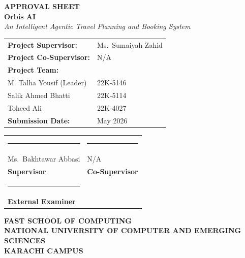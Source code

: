 \documentclass[12pt, a4paper]{article}
\begin{document}
\newpage
\thispagestyle{empty}
\begin{center}
  {\fontsize{18}{22}\selectfont \textbf{APPROVAL SHEET}}\\[2.5em]
  {\fontsize{15}{18}\selectfont \textbf{Orbis AI}}\\[0.5em]
  {\fontsize{12}{14}\selectfont \textit{An Intelligent Agentic Travel Planning and Booking System}}\\[4em]
\end{center}

\renewcommand{\arraystretch}{1.8}
\begin{tabular}{p{5cm} p{9cm}}
  \textbf{Project Supervisor:}     & Ms.\ Sumaiyah Zahid \\
  \textbf{Project Co-Supervisor:}  & N/A \\[0.5em]
  \textbf{Project Team:}           & \\
  \hspace{1cm} M. Talha Yousif (Leader) & 22K-5146 \\
  \hspace{1cm} Salik Ahmed Bhatti       & 22K-5114 \\
  \hspace{1cm} Toheed Ali               & 22K-4027 \\[0.5em]
  \textbf{Submission Date:}        & May 2026 \\
\end{tabular}

\vspace{4em}

\begin{tabular}{p{7cm} p{7cm}}
  \rule{6cm}{0.4pt} & \rule{6cm}{0.4pt} \\[0.3em]
  Ms.\ Bakhtawar Abbasi   & N/A \\
  \textbf{Supervisor}    & \textbf{Co-Supervisor} \\[3em]
  \rule{6cm}{0.4pt} & \\[0.3em]
  \textbf{External Examiner} & \\
\end{tabular}

\vspace{4em}

\begin{center}
  \textbf{FAST SCHOOL OF COMPUTING}\\
  \textbf{NATIONAL UNIVERSITY OF COMPUTER AND EMERGING SCIENCES}\\
  \textbf{KARACHI CAMPUS}
\end{center}
\end{document}
